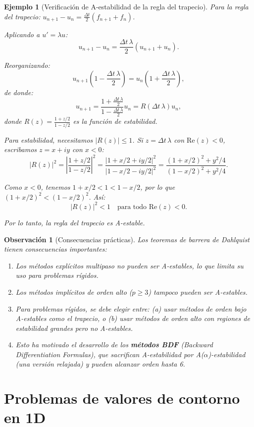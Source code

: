 \documentclass[a4paper,11pt]{report}
\newtheorem{example}[theorem]{Ejemplo}
\newtheorem{remark}[theorem]{Observación}
\begin{document}
\begin{example}[Verificación de A-estabilidad de la regla del trapecio]
Para la regla del trapecio: $u_{n+1} - u_n = \frac{\Delta t}{2}(f_{n+1} + f_n)$.

Aplicando a $u' = \lambda u$:
\[
u_{n+1} - u_n = \frac{\Delta t\,\lambda}{2}(u_{n+1} + u_n).
\]

Reorganizando:
\[
u_{n+1}\left(1 - \frac{\Delta t\,\lambda}{2}\right) = u_n\left(1 + \frac{\Delta t\,\lambda}{2}\right),
\]
de donde:
\[
u_{n+1} = \frac{1 + \frac{\Delta t\,\lambda}{2}}{1 - \frac{\Delta t\,\lambda}{2}} u_n = R(\Delta t\,\lambda) u_n,
\]
donde $R(z) = \frac{1 + z/2}{1 - z/2}$ es la función de estabilidad.

Para estabilidad, necesitamos $|R(z)| \leq 1$. Si $z = \Delta t\,\lambda$ con $\text{Re}(z) < 0$, escribamos $z = x + iy$ con $x < 0$:
\[
|R(z)|^2 = \left|\frac{1 + z/2}{1 - z/2}\right|^2 = \frac{|1 + x/2 + iy/2|^2}{|1 - x/2 - iy/2|^2} = \frac{(1 + x/2)^2 + y^2/4}{(1 - x/2)^2 + y^2/4}.
\]

Como $x < 0$, tenemos $1 + x/2 < 1 < 1 - x/2$, por lo que $(1 + x/2)^2 < (1 - x/2)^2$. Así:
\[
|R(z)|^2 < 1 \quad \text{para todo } \text{Re}(z) < 0.
\]

Por lo tanto, la regla del trapecio es A-estable.
\end{example}

\begin{remark}[Consecuencias prácticas]
Los teoremas de barrera de Dahlquist tienen consecuencias importantes:
\begin{enumerate}
\item Los métodos explícitos multipaso no pueden ser A-estables, lo que limita su uso para problemas rígidos.
\item Los métodos implícitos de orden alto ($p \geq 3$) tampoco pueden ser A-estables.
\item Para problemas rígidos, se debe elegir entre: (a) usar métodos de orden bajo A-estables como el trapecio, o (b) usar métodos de orden alto con regiones de estabilidad grandes pero no A-estables.
\item Esto ha motivado el desarrollo de los \textbf{métodos BDF} (Backward Differentiation Formulas), que sacrifican A-estabilidad por A($\alpha$)-estabilidad (una versión relajada) y pueden alcanzar orden hasta 6.
\end{enumerate}
\end{remark}

\section{Problemas de valores de contorno en 1D}
\end{document}
